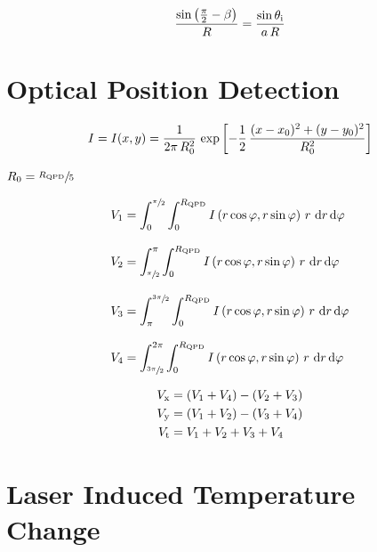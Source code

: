 \begin{equation}
  \frac{\sin\left( \frac{\pi}{2}-\beta \right)}{R} = 
  \frac{\sin\theta_{\mathrm{i}}}{a\,R}
  \label{eq:Th-sine-law}
\end{equation}


\section{Optical Position Detection\label{sec:Th-QPD}}

\begin{equation}
  I = I(x, y) = \frac{1}{2\pi\,R_{0}^{2}}\,\exp\left[ 
  -\frac{1}{2}\,\frac{(x-x_{0})^{2} + (y - y_{0})^{2}}{R_{0}^{2}} \right]
    \label{eq:Th-intensity}
\end{equation}

$R_{0}=\sfrac{R_{\mathrm{QPD}}}{5}$


\begin{subequations}
\begin{align}
  V_{\mathrm{1}} & = \int_{0}^{\sfrac{\pi}{2}}\int_{0}^{R_{\mathrm{QPD}}}
  I\left( r\cos\varphi, r\sin\varphi \right)\,r\,\dd{r}\dd{\varphi} 
  \\[3mm]
  V_{\mathrm{2}} & = \int_{\sfrac{\pi}{2}}^{\pi}\int_{0}^{R_{\mathrm{QPD}}}
  I\left(r\cos\varphi, r\sin\varphi\right)\,r\,\dd{r}\dd{\varphi} 
  \\[3mm]
  V_{\mathrm{3}} & = \int_{\pi}^{\sfrac{3\pi}{2}}\int_{0}^{R_{\mathrm{QPD}}}
  I\left(r\cos\varphi, r\sin\varphi\right)\,r\,\dd{r}\dd{\varphi} 
  \\[3mm]
  V_{\mathrm{4}} & = \int_{\sfrac{3\pi}{2}}^{2\pi}\int_{0}^{R_{\mathrm{QPD}}}
  I\left(r\cos\varphi, r\sin\varphi\right)\,r\,\dd{r}\dd{\varphi}
\end{align}
\end{subequations}


\begin{subequations}
\begin{align}
  V_{\mathrm{x}} & = \left( V_{\mathrm{1}}+V_{\mathrm{4}} \right) - \left( V_{\mathrm{2}} + 
  V_{\mathrm{3}}  \right) \\
  V_{\mathrm{y}} & = \left( V_{\mathrm{1}}+V_{\mathrm{2}} \right) - \left( V_{\mathrm{3}} + 
  V_{\mathrm{4}}  \right) \\
  V_{\mathrm{t}} & = V_{\mathrm{1}}+V_{\mathrm{2}} + V_{\mathrm{3}} + V_{\mathrm{4}}
\end{align}
\end{subequations}


\section{Laser Induced Temperature Change\label{sec:Th-temperature}}

